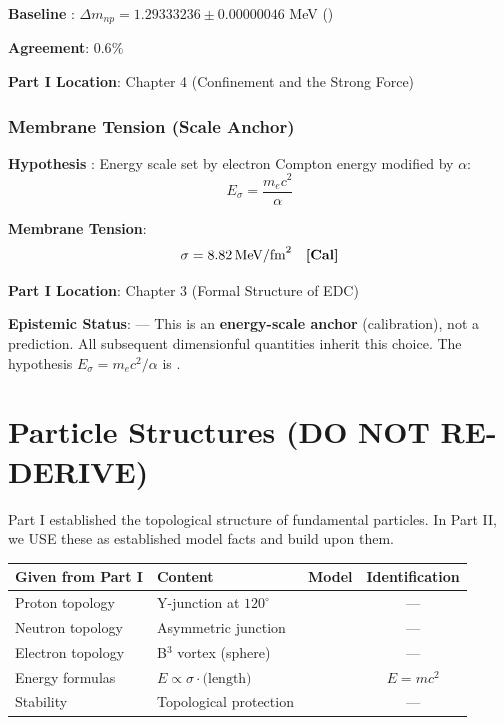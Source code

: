 \textbf{Baseline} \tagBL{}: $\Delta m_{np} = 1.29333236 \pm 0.00000046$ MeV ()

\textbf{Agreement}: $0.6\%$

\textbf{Part I Location}: Chapter 4 (Confinement and the Strong Force)


\subsubsection{Membrane Tension (Scale Anchor) \tagCal}

\textbf{Hypothesis} \tagP{}:
Energy scale set by electron Compton energy modified by $\alpha$:
\begin{equation}
E_\sigma = \frac{m_e c^2}{\alpha}
\end{equation}

\textbf{Membrane Tension}:
\begin{equation}
\sigma = 8.82\,\text{MeV/fm}^2 \quad \textbf{[Cal]}
\label{eq:sigma_bridge}
\end{equation}

\textbf{Part I Location}: Chapter 3 (Formal Structure of EDC)

\textbf{Epistemic Status}: \tagCal{} --- This is an \textbf{energy-scale anchor} (calibration),
not a prediction. All subsequent dimensionful quantities inherit this choice.
The hypothesis $E_\sigma = m_e c^2/\alpha$ is \tagP{}.

\section{Particle Structures (DO NOT RE-DERIVE)}
\label{sec:bridge_particles}

Part I established the topological structure of fundamental particles.
In Part II, we USE these as established model facts and build upon them.

\begin{center}
\small
\begin{tabular}{llcc}
\toprule
\textbf{Given from Part I} & \textbf{Content} & \textbf{Model} & \textbf{Identification} \\
\midrule
Proton topology & Y-junction at $120^\circ$ & \tagDer{} & --- \\
Neutron topology & Asymmetric junction & \tagDer{} & --- \\
Electron topology & B$^3$ vortex (sphere) & \tagDer{} & --- \\
Energy formulas & $E \propto \sigma \cdot \text{(length)}$ & \tagDer{} & $E = mc^2$ \tagDc{} \\
Stability & Topological protection & \tagDer{} & --- \\
\bottomrule
\end{tabular}
\end{center}

